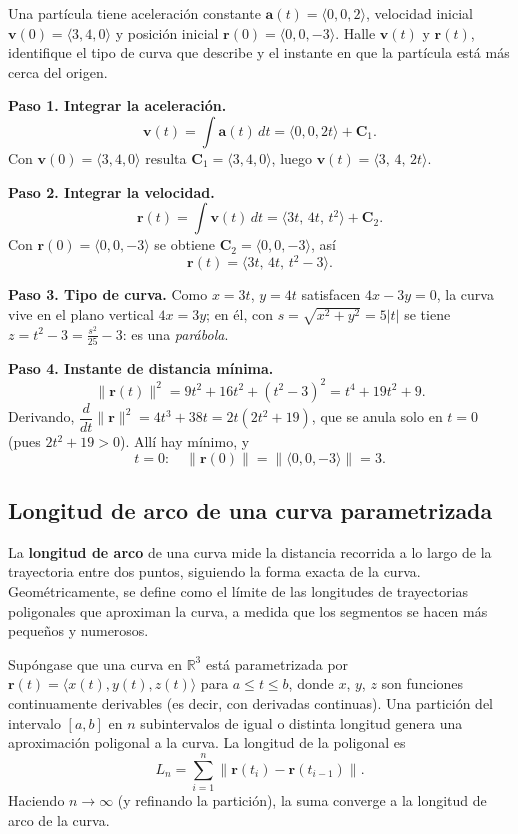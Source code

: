 \begin{example}
Una partícula tiene aceleración constante $\mathbf a(t)=\langle 0,0,2\rangle$,
velocidad inicial $\mathbf v(0)=\langle 3,4,0\rangle$ y posición inicial
$\mathbf r(0)=\langle 0,0,-3\rangle$. Halle $\mathbf v(t)$ y $\mathbf r(t)$,
identifique el tipo de curva que describe y el instante en que la partícula
está más cerca del origen.
\begin{myproof}
\textbf{Paso 1. Integrar la aceleración.}
\[
  \mathbf v(t)=\int\mathbf a(t)\,dt=\langle 0,0,2t\rangle+\mathbf C_1.
\]
Con $\mathbf v(0)=\langle 3,4,0\rangle$ resulta $\mathbf C_1=\langle 3,4,0\rangle$,
luego $\mathbf v(t)=\langle 3,\,4,\,2t\rangle$.

\textbf{Paso 2. Integrar la velocidad.}
\[
  \mathbf r(t)=\int\mathbf v(t)\,dt=\langle 3t,\,4t,\,t^2\rangle+\mathbf C_2.
\]
Con $\mathbf r(0)=\langle 0,0,-3\rangle$ se obtiene $\mathbf C_2=\langle 0,0,-3\rangle$, así
\[
  \boxed{\ \mathbf r(t)=\langle 3t,\,4t,\,t^2-3\rangle.\ }
\]

\textbf{Paso 3. Tipo de curva.}
Como $x=3t$, $y=4t$ satisfacen $4x-3y=0$, la curva vive en el plano vertical
$4x=3y$; en él, con $s=\sqrt{x^2+y^2}=5|t|$ se tiene $z=t^2-3=\tfrac{s^2}{25}-3$:
es una \emph{parábola}.

\textbf{Paso 4. Instante de distancia mínima.}
\[
  \|\mathbf r(t)\|^2=9t^2+16t^2+(t^2-3)^2=t^4+19t^2+9.
\]
Derivando, $\dfrac{d}{dt}\|\mathbf r\|^2=4t^3+38t=2t(2t^2+19)$, que se anula
solo en $t=0$ (pues $2t^2+19>0$). Allí hay mínimo, y
\[
  \boxed{\ t=0:\quad \|\mathbf r(0)\|=\|\langle 0,0,-3\rangle\|=3.\ }
\]
\end{myproof}
\end{example}

\subsection{Longitud de arco de una curva parametrizada}
\label{subsec:arc-length}

La \textbf{longitud de arco} de una curva mide la distancia recorrida a
lo largo de la trayectoria entre dos puntos, siguiendo la forma exacta
de la curva. Geométricamente, se define como el límite de las longitudes
de trayectorias poligonales que aproximan la curva, a medida que los
segmentos se hacen más pequeños y numerosos.

Supóngase que una curva en $\mathbb{R}^3$ está parametrizada por
$\mathbf{r}(t) = \langle x(t), y(t), z(t) \rangle$ para
$a \leq t \leq b$, donde $x$, $y$, $z$ son funciones continuamente
derivables (es decir, con derivadas continuas). Una partición del
intervalo $[a,b]$ en $n$ subintervalos de igual o distinta longitud
genera una aproximación poligonal a la curva. La longitud de la
poligonal es
\[
L_n = \sum_{i=1}^n \|\mathbf{r}(t_i) - \mathbf{r}(t_{i-1})\|.
\]
Haciendo $n \to \infty$ (y refinando la partición), la suma converge a
la longitud de arco de la curva.

